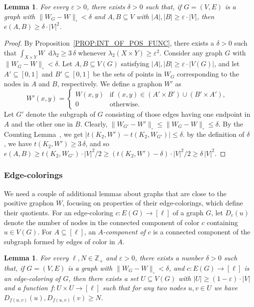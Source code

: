 \documentclass[10pt]{article}
\theoremstyle{plain}
\newtheorem{lem}[thm]{Lemma}
\theoremstyle{definition}
\newcommand*\diff{\mathop{}\!\mathrm{d}}
\begin{document}
\begin{lem}\label{LEM:NON-COMP-CLASSES-0}
        For every $\varepsilon>0$, there exists $\delta>0$ such that, if $G=(V,E)$ is a graph with $\|W_G-W\|_\square<\delta$ and $A,B\subseteq V$ with $|A|,|B|\ge \varepsilon\cdot |V|$, then $e(A,B)\ge \delta\cdot |V|^2$.
\end{lem}
\begin{proof}
    By Proposition~\ref{PROP:INT_OF_POS_FUNC}, there exists a $\delta>0$ such that $\int_{X\times Y}W\diff \lambda_2\ge 3\,\delta$ whenever $\lambda_2(X\times Y)\ge \varepsilon^2$. Consider any graph $G$ with $\|W_G-W\|_{\square}<\delta$. Let $A,B\subseteq V(G)$ satisfying $|A|,|B|\ge\varepsilon\cdot |V(G)|$, and let $A'\subseteq  [0,1]$ and $B'\subseteq[0,1]$ be the sets of points in $W_G$ corresponding to the nodes in $A$ and $B$, respectively. We define a graphon $W'$ as
    \[
    W'(x,y)=\begin{cases}
        W(x,y) &\text{if $(x,y)\in (A'\times B')\cup(B'\times A')$},\\
        0& \text{otherwise.}
    \end{cases}
    \]
Let $G'$ denote the subgraph of $G$ consisting of those edges having one endpoint in $A$ and the other one in $B$. Clearly, $\|W_{G'}-W'\|_\square\le \|W_{G}-W\|_{\square}\le\delta$. By the Counting Lemma~\cite[Lemma 10.23]{lovasz2012large}, we get $|t(K_2,W')-t(K_2,W_{G'})|\le \delta$. by the definition of $\delta$, we have $t(K_2,W')\ge 3\,\delta$, and so $e(A,B)\ge t(K_2,W_{G'})\cdot|V|^2/2\ge (t(K_2,W') - \delta)\cdot|V|^2/2 \ge \delta\,|V|^2$.
\end{proof}

\subsubsection{Edge-colorings} 

We need a couple of additional lemmas about graphs that are close to the positive graphon $W$, focusing on properties of their edge-colorings, which define their quotients. For an edge-coloring $c\colon E(G)\to[\ell]$ of a graph $G$, let $D_c(u)$ denote the number of nodes in the connected component of color $c$ containing $u\in V(G)$. For $A\subseteq[\ell]$, an {\it $A$-component of $c$} is a connected component of the subgraph formed by edges of color in $A$.

\begin{lem}\label{LEM:PAIRWASE-dense-colors}
     For every $\ell,N\in\mathbb{Z}_+$ and $\varepsilon>0$, there exists a number $\delta>0$ such that, if $G=(V,E)$ is a graph with $\|W_G-W\|_\square<\delta$, and $c\colon E(G)\to[\ell]$ is an edge-coloring of $G$, then there exists a set $U\subseteq V(G)$ with $|U|\ge(1-\varepsilon)\cdot |V|$ and a function $f\colon U\times U\to[\ell]$ such that for any two nodes $u,v\in U$ we have $D_{f(u,v)}(u),D_{f(u,v)}(v)\ge N$.
\end{lem}
\end{document}
